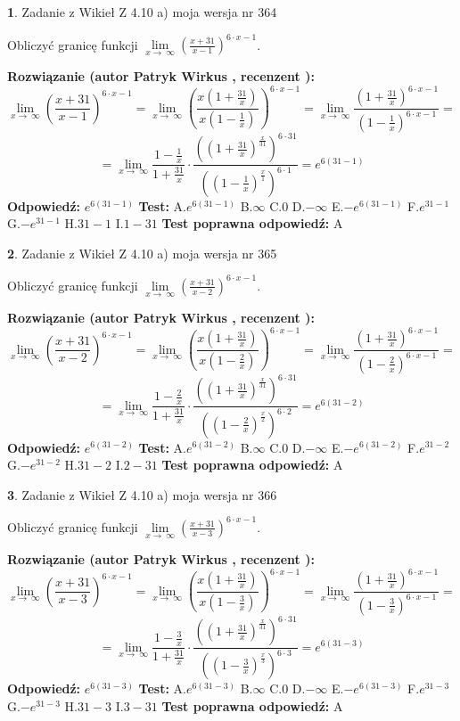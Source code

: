 \documentclass[12pt, a4paper]{article}
\theoremstyle{definition} %
\newtheorem{zad}{}
\newcommand{\zadStart}[1]{\begin{zad}#1\newline}
\newcommand{\zadStop}{\end{zad}}
\newcommand{\rozwStart}[2]{\noindent \textbf{Rozwiązanie (autor #1 , recenzent #2): }\newline}
\newcommand{\rozwStop}{\newline}
\newcommand{\odpStart}{\noindent \textbf{Odpowiedź:}\newline}
\newcommand{\odpStop}{\newline}
\newcommand{\testStart}{\noindent \textbf{Test:}\newline}
\newcommand{\testStop}{\newline}
\newcommand{\kluczStart}{\noindent \textbf{Test poprawna odpowiedź:}\newline}
\newcommand{\kluczStop}{\newline}
\begin{document}
\zadStart{Zadanie z Wikieł Z 4.10 a) moja wersja nr 364}


Obliczyć granicę funkcji  $\lim\limits_{x\to\ \infty}(\frac{x+31}{x-1})^{6\cdot x-1}$.
\zadStop
\rozwStart{Patryk Wirkus}{}
$$\lim\limits_{x\to\ \infty}(\frac{x+31}{x-1})^{6\cdot x-1} = \lim\limits_{x\to\ \infty}(\frac{x(1+\frac{31}{x})}{x(1-\frac{1}{x})})^{6\cdot x-1}=\lim\limits_{x\to\ \infty}\frac{(1+\frac{31}{x})^{6\cdot x-1}}{(1-\frac{1}{x})^{6\cdot x-1}}=$$
$$=\lim\limits_{x\to\ \infty}\frac{1-\frac{1}{x}}{1+\frac{31}{x}}\cdot\frac{((1+\frac{31}{x})^{\frac{x}{31}})^{6\cdot31}}{((1-\frac{1}{x})^{\frac{x}{1}})^{6\cdot1}}=e^{6(31-1)}$$
\rozwStop
\odpStart
$e^{6(31-1)}$
\odpStop
\testStart
A.$e^{6(31-1)}$ B.$\infty$ C.$0$ D.$-\infty$ E.$-e^{6(31-1)}$
F.$e^{31-1}$ G.$-e^{31-1}$
H.$31-1$
I.$1-31$
\testStop
\kluczStart
A
\kluczStop



\zadStart{Zadanie z Wikieł Z 4.10 a) moja wersja nr 365}


Obliczyć granicę funkcji  $\lim\limits_{x\to\ \infty}(\frac{x+31}{x-2})^{6\cdot x-1}$.
\zadStop
\rozwStart{Patryk Wirkus}{}
$$\lim\limits_{x\to\ \infty}(\frac{x+31}{x-2})^{6\cdot x-1} = \lim\limits_{x\to\ \infty}(\frac{x(1+\frac{31}{x})}{x(1-\frac{2}{x})})^{6\cdot x-1}=\lim\limits_{x\to\ \infty}\frac{(1+\frac{31}{x})^{6\cdot x-1}}{(1-\frac{2}{x})^{6\cdot x-1}}=$$
$$=\lim\limits_{x\to\ \infty}\frac{1-\frac{2}{x}}{1+\frac{31}{x}}\cdot\frac{((1+\frac{31}{x})^{\frac{x}{31}})^{6\cdot31}}{((1-\frac{2}{x})^{\frac{x}{2}})^{6\cdot2}}=e^{6(31-2)}$$
\rozwStop
\odpStart
$e^{6(31-2)}$
\odpStop
\testStart
A.$e^{6(31-2)}$ B.$\infty$ C.$0$ D.$-\infty$ E.$-e^{6(31-2)}$
F.$e^{31-2}$ G.$-e^{31-2}$
H.$31-2$
I.$2-31$
\testStop
\kluczStart
A
\kluczStop



\zadStart{Zadanie z Wikieł Z 4.10 a) moja wersja nr 366}


Obliczyć granicę funkcji  $\lim\limits_{x\to\ \infty}(\frac{x+31}{x-3})^{6\cdot x-1}$.
\zadStop
\rozwStart{Patryk Wirkus}{}
$$\lim\limits_{x\to\ \infty}(\frac{x+31}{x-3})^{6\cdot x-1} = \lim\limits_{x\to\ \infty}(\frac{x(1+\frac{31}{x})}{x(1-\frac{3}{x})})^{6\cdot x-1}=\lim\limits_{x\to\ \infty}\frac{(1+\frac{31}{x})^{6\cdot x-1}}{(1-\frac{3}{x})^{6\cdot x-1}}=$$
$$=\lim\limits_{x\to\ \infty}\frac{1-\frac{3}{x}}{1+\frac{31}{x}}\cdot\frac{((1+\frac{31}{x})^{\frac{x}{31}})^{6\cdot31}}{((1-\frac{3}{x})^{\frac{x}{3}})^{6\cdot3}}=e^{6(31-3)}$$
\rozwStop
\odpStart
$e^{6(31-3)}$
\odpStop
\testStart
A.$e^{6(31-3)}$ B.$\infty$ C.$0$ D.$-\infty$ E.$-e^{6(31-3)}$
F.$e^{31-3}$ G.$-e^{31-3}$
H.$31-3$
I.$3-31$
\testStop
\kluczStart
A
\kluczStop
\end{document}
